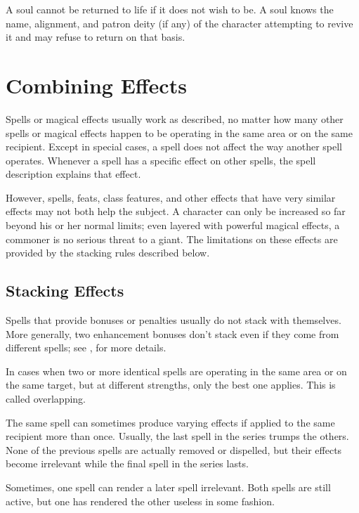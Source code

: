  A soul cannot be returned to life if it does not wish to be. A soul knows the name, alignment, and patron deity (if any) of the character attempting to revive it and may refuse to return on that basis.

\section{Combining Effects}
Spells or magical effects usually work as described, no matter how many other spells or magical effects happen to be operating in the same area or on the same recipient. Except in special cases, a spell does not affect the way another spell operates. Whenever a spell has a specific effect on other spells, the spell description explains that effect.

However, spells, feats, class features, and other effects that have very similar effects may not both help the subject. A character can only be increased so far beyond his or her normal limits; even layered with powerful magical effects, a commoner is no serious threat to a giant. The limitations on these effects are provided by the stacking rules described below.

\subsection{Stacking Effects}
Spells that provide bonuses or penalties usually do not stack with themselves. More generally, two enhancement bonuses don't stack even if they come from different spells; see , for more details.

 In cases when two or more identical spells are operating in the same area or on the same target, but at different strengths, only the best one applies. This is called overlapping.

 The same spell can sometimes produce varying effects if applied to the same recipient more than once. Usually, the last spell in the series trumps the others. None of the previous spells are actually removed or dispelled, but their effects become irrelevant while the final spell in the series lasts.

 Sometimes, one spell can render a later spell irrelevant. Both spells are still active, but one has rendered the other useless in some fashion.

